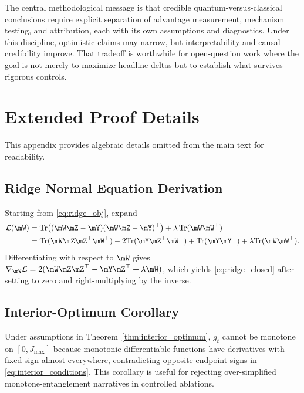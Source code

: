 \documentclass{article} %
\begin{document}
The central methodological message is that credible quantum-versus-classical conclusions require explicit separation of advantage measurement, mechanism testing, and attribution, each with its own assumptions and diagnostics. Under this discipline, optimistic claims may narrow, but interpretability and causal credibility improve. That tradeoff is worthwhile for open-question work where the goal is not merely to maximize headline deltas but to establish what survives rigorous controls.

\clearpage{}\label{sec:end_of_main}






\appendix
\clearpage{}\label{sec:appendix_start}

\section{Extended Proof Details}
This appendix provides algebraic details omitted from the main text for readability.

\subsection{Ridge Normal Equation Derivation}
Starting from \eqref{eq:ridge_obj}, expand
\begin{align*}
\mathcal{L}(\mW)
&=\mathrm{Tr}\big((\mW\mZ-\mY)(\mW\mZ-\mY)^{\top}\big)+\lambda\,\mathrm{Tr}(\mW\mW^{\top})\\
&=\mathrm{Tr}(\mW\mZ\mZ^{\top}\mW^{\top})-2\mathrm{Tr}(\mY\mZ^{\top}\mW^{\top})+\mathrm{Tr}(\mY\mY^{\top})+\lambda\mathrm{Tr}(\mW\mW^{\top}).
\end{align*}
Differentiating with respect to $\mW$ gives
$\nabla_{\mW}\mathcal{L}=2(\mW\mZ\mZ^{\top}-\mY\mZ^{\top}+\lambda\mW)$,
which yields \eqref{eq:ridge_closed} after setting to zero and right-multiplying by the inverse.

\subsection{Interior-Optimum Corollary}
Under assumptions in Theorem~\ref{thm:interior_optimum}, $g_t$ cannot be monotone on $[0,J_{\max}]$ because monotonic differentiable functions have derivatives with fixed sign almost everywhere, contradicting opposite endpoint signs in \eqref{eq:interior_conditions}. This corollary is useful for rejecting over-simplified monotone-entanglement narratives in controlled ablations.
\end{document}
